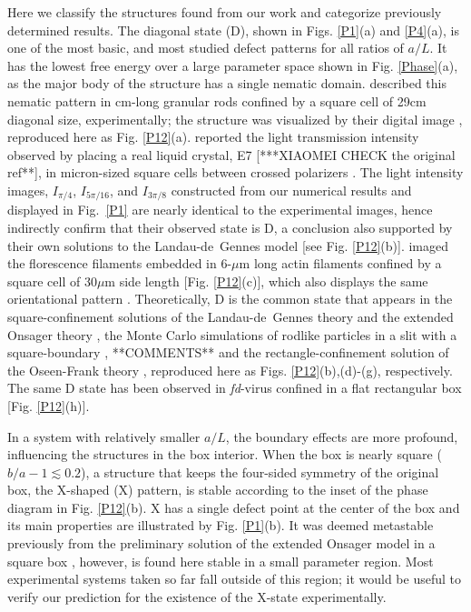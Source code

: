 \documentclass[prl,twocolumn,preprintnumbers,reprint]{revtex4}
\begin{document}

 Here we classify the structures found from our work and categorize previously determined results.
The diagonal state (D), shown in Figs. \ref{P1}(a) and  \ref{P4}(a), is one of the most basic, and most studied defect patterns for all ratios of $a/L$. It has the lowest free energy over a large parameter space shown in Fig. \ref{Phase}(a), as the major body of the structure has a single nematic domain. \citeauthor{Galanis2006} described this nematic pattern in cm-long granular rods confined by a square cell of 29cm diagonal size, experimentally; the structure was visualized by their digital image \cite{Galanis2006}, reproduced here as Fig. \ref{P12}(a). \citeauthor{Tsakonas2007} reported the light transmission intensity observed by placing a real liquid crystal, E7 [***XIAOMEI CHECK the original ref**], in micron-sized square cells between crossed polarizers \cite{Tsakonas2007}. The light intensity images, $I_{\pi/ 4}$, $I_{5\pi/ 16}$, and  $I_{3\pi/ 8}$ constructed from our numerical results and displayed in Fig.~\ref{P1} are nearly identical to the experimental images, hence indirectly confirm that their observed state is D, a conclusion also supported by their own solutions to the Landau-de~Gennes model [see Fig. \ref{P12}(b)]. \citeauthor{Mulder2011} imaged the florescence filaments embedded in 6-$\mu$m long actin filaments  confined by a square cell of 30$\mu$m side length [Fig. \ref{P12}(c)], which also displays the same orientational pattern \cite{Mulder2011}. Theoretically, D is the common state that appears in the square-confinement solutions of the Landau-de~Gennes theory \cite{Tsakonas2007,Luo2012} and the extended Onsager theory
\cite{Chen2013},  the Monte Carlo simulations of rodlike particles in a slit with a square-boundary \cite{Mulder2015, Garlea2016}, **COMMENTS** and the rectangle-confinement solution of the Oseen-Frank theory \cite{Lewis2014}, reproduced here as Figs. \ref{P12}(b),(d)-(g), respectively.
The same D state has been observed in {\it fd}-virus confined in a flat rectangular box \citeauthor{Lewis2014} [Fig. \ref{P12}(h)].

In a system  with relatively smaller $a/L$, the boundary effects are more profound, influencing the structures in the box interior. When the box is nearly square ($b/a -1\lesssim 0.2$), a structure that keeps the four-sided symmetry of the original box, the X-shaped (X) pattern, is stable according to the inset of the phase diagram in Fig. \ref{P12}(b).
X has a single defect point at the center of the box and its main properties are illustrated by  Fig. \ref{P1}(b). It was deemed metastable previously from the preliminary solution of the extended Onsager model in a square box \cite{Chen2013}, however, is found here stable in a small parameter region.
Most experimental systems taken so far fall outside of this region; it would be useful to verify our prediction for the existence of the X-state experimentally.
\end{document}
